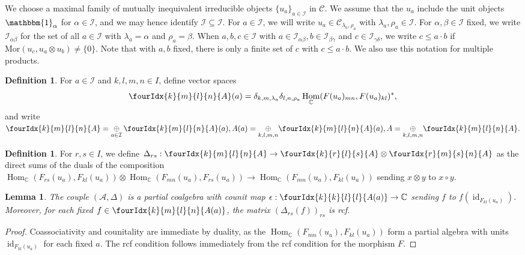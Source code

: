 \documentclass[10pt]{article}
\DeclareMathOperator{\id}{id}
\DeclareMathOperator{\Hom}{Hom}
\newcommand{\C}{\mathbb{C}}
\newcommand{\CatC}{\mathcal{C}}
\newcommand{\Mor}{\mathrm{Mor}}
\newcommand{\Unitb}{\mathbbm{1}}
\newcommand{\Gr}[5]{\fourIdx{#2}{#4}{#3}{#5}{#1}}%
\newtheorem{Lem}[Theorem]{Lemma}
\theoremstyle{definition}
\newtheorem{Def}[Theorem]{Definition}
\numberwithin{equation}{section}
\begin{document}
We choose a maximal family of mutually inequivalent irreducible objects $\{u_a\}_{a\in \mathcal{I}}$ in $\CatC$. We assume that the $u_a$ include the unit objects $\Unitb_{\alpha}$ for $\alpha\in \mathscr{I}$, and we may hence identify $\mathscr{I}\subseteq \mathcal{I}$. For $a\in \mathcal{I}$, we will write $u_a \in \CatC_{\lambda_a,\rho_a}$ with $\lambda_a,\rho_a\in \mathscr{I}$. For $\alpha,\beta\in \mathscr{I}$ fixed, we write $\mathcal{I}_{\alpha\beta}$ for the set of all $a\in \mathcal{I}$ with $\lambda_a=\alpha$ and $\rho_a=\beta$. When $a,b,c\in \mathcal{I}$ with $a\in \mathcal{I}_{\alpha\beta},b\in \mathcal{I}_{\beta\gamma}$ and $c\in \mathcal{I}_{\gamma\delta}$, we write $c\leq a\cdot b$ if $\Mor(u_c,u_a\otimes u_b)\neq \{0\}$. Note that with $a,b$ fixed, there is only a finite set of $c$ with $c\leq a\cdot b$. We also use this notation for multiple products.

\begin{Def} For $a\in \mathcal{I}$ and $k,l,m,n\in I$, define vector spaces \[\Gr{A}{k}{l}{m}{n}(a) =  \delta_{k,m,\lambda_a}\delta_{l,n,\rho_a} \Hom_{\C}(F(u_a)_{mn},F(u_a)_{kl})^*,\] and write $\Gr{A}{k}{l}{m}{n} =\underset{a\in \mathcal{I}}{\oplus}\, \Gr{A}{k}{l}{m}{n}(a), A(a) = \underset{k,l,m,n}{\oplus} \Gr{A}{k}{l}{m}{n}(a), A = \underset{k,l,m,n}{\oplus} \Gr{A}{k}{l}{m}{n}.$
\end{Def} 


\begin{Def} For $r,s\in I$, we define $\Delta_{rs}: \Gr{A}{k}{l}{m}{n}\rightarrow \Gr{A}{k}{l}{r}{s}\otimes \Gr{A}{r}{s}{m}{n}$ as the direct sums of the duals of the composition $\Hom_{\C}(F_{rs}(u_a),F_{kl}(u_a)) \otimes \Hom_{\C}(F_{mn}(u_a),F_{rs}(u_a))\rightarrow \Hom_{\C}(F_{mn}(u_a),F_{kl}(u_a))$ sending $x\otimes y$ to $x\circ y$.
\end{Def} 

\begin{Lem} The couple $(\mathscr{A},\Delta)$ is a partial coalgebra with counit map $\epsilon:\Gr{A(a)}{k}{l}{k}{l}\rightarrow \C$ sending $f$ to $f(\id_{F_{kl}(u_a)})$. Moreover, for each fixed $f\in \Gr{A(a)}{k}{l}{m}{n}$, the matrix $\left(\Delta_{rs}(f)\right)_{rs}$ is rcf.
\end{Lem} 
\begin{proof} Coassociativity and counitality are immediate by duality, as the $\Hom_{\C}(F_{mn}(u_a),F_{kl}(u_a))$ form a partial algebra with units $\id_{F_{kl}(u_a)}$ for each fixed $a$. The rcf condition follows immediately from the rcf condition for the morphism $F$.
\end{proof}
\end{document}
